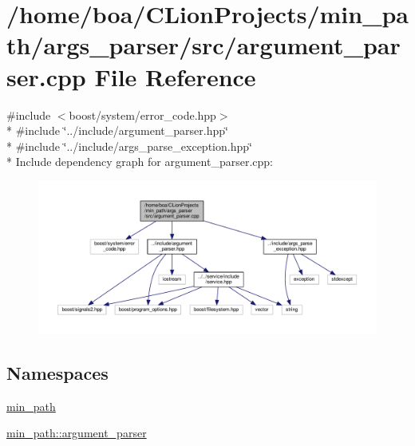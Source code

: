 \hypertarget{a00013}{}\section{/home/boa/\+C\+Lion\+Projects/min\+\_\+path/args\+\_\+parser/src/argument\+\_\+parser.cpp File Reference}
\label{a00013}
{\ttfamily \#include $<$boost/system/error\+\_\+code.\+hpp$>$}\\*
{\ttfamily \#include \char`\"{}../include/argument\+\_\+parser.\+hpp\char`\"{}}\\*
{\ttfamily \#include \char`\"{}../include/args\+\_\+parse\+\_\+exception.\+hpp\char`\"{}}\\*
Include dependency graph for argument\+\_\+parser.\+cpp\+:
\nopagebreak
\begin{figure}[H]
\begin{center}
\leavevmode
\includegraphics[width=350pt]{d6/d42/a00043}
\end{center}
\end{figure}
\subsection*{Namespaces}
\begin{DoxyCompactItemize}
\item 
 \hyperlink{a00033}{min\+\_\+path}
\item 
 \hyperlink{a00034}{min\+\_\+path\+::argument\+\_\+parser}
\end{DoxyCompactItemize}

